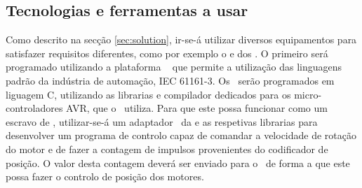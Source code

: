 \subsection{Tecnologias e ferramentas a usar}
Como descrito na secção \ref{sec:solution}, ir-se-á utilizar diversos
equipamentos para satisfazer requisitos diferentes, como por exemplo o
\raspi \cite[]{foundation:RaspberryPi} e dos \arduino. O primeiro será programado utilizando a plataforma 
\codesys\ \cite[]{CODESYS:codesys} que permite a utilização das linguagens
padrão da indústria de automação, IEC 61161-3. Os \arduino\ serão programados
em liguagem C, utilizando as librarias e compilador dedicados para os
micro-controladores AVR, que o \arduino\ utiliza. Para que este possa
funcionar como um escravo de \ecat, utilizar-se-á um adaptador \easycat\
da \cite{ABT:EasyCAT} e as respetivas librarias para desenvolver um
programa de controlo capaz de comandar a velocidade de rotação do motor
e de fazer a contagem de impulsos provenientes do codificador de posição.
O valor desta contagem deverá ser enviado para o \raspi\ de forma a que
este possa fazer o controlo de posição dos motores.

